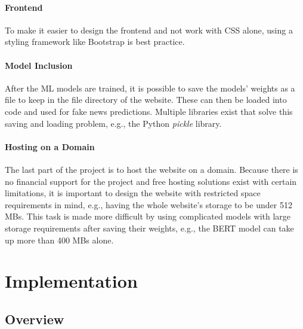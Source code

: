 \documentclass{l4proj}
\begin{document}
\subsubsection{Frontend}

To make it easier to design the frontend and not work with CSS alone, using a styling framework like Bootstrap is best practice.

\subsubsection{Model Inclusion}

After the ML models are trained, it is possible to save the models' weights as a file to keep in the file directory of the website. These can then be loaded into code and used for fake news predictions. Multiple libraries exist that solve this saving and loading problem, e.g., the Python \textit{pickle} library.

\subsubsection{Hosting on a Domain}

The last part of the project is to host the website on a domain. Because there is no financial support for the project and free hosting solutions exist with certain limitations, it is important to design the website with restricted space requirements in mind, e.g., having the whole website's storage to be under 512 MBs. This task is made more difficult by using complicated models with large storage requirements after saving their weights, e.g., the BERT model can take up more than 400 MBs alone.

\chapter{Implementation}
\label{chap:implem}


\section{Overview}
\end{document}
